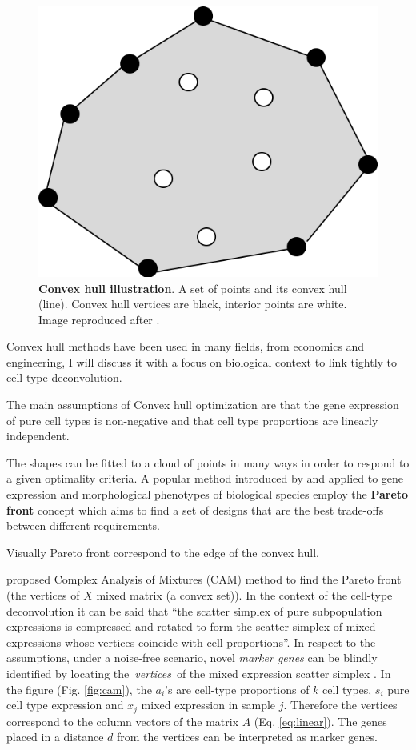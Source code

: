 \documentclass[12pt,]{book}
\theoremstyle{definition}
\theoremstyle{definition}
\theoremstyle{definition}
\theoremstyle{remark}
\begin{document}
\begin{figure}

{\centering \includegraphics[width=0.5\linewidth]{figures-ext/convexhull} 

}

\caption[Convex hull illustration]{\textbf{Convex hull illustration}. A set of
points and its convex hull (line). Convex hull vertices are black,
interior points are white. Image reproduced after \citet{Erickson2018}.}\label{fig:convexhull}
\end{figure}





Convex hull methods have been used in many fields, from economics and
engineering, I will discuss it with a focus on biological context to
link tightly to cell-type deconvolution.

The main assumptions of Convex hull optimization are that the gene
expression of pure cell types is non-negative and that cell type
proportions are linearly independent.

The shapes can be fitted to a cloud of points in many ways in order to
respond to a given optimality criteria. A popular method introduced by
\citet{Shoval2012} and applied to gene expression and morphological
phenotypes of biological species employ the \textbf{Pareto front}
concept which aims to find a set of designs that are the best trade-offs
between different requirements.

Visually Pareto front correspond to the edge of the convex hull.

\citet{Wang2013} proposed Complex Analysis of Mixtures (CAM) method to
find the Pareto front (the vertices of \(X\) mixed matrix (a convex
set)). In the context of the cell-type deconvolution it can be said that
``the scatter simplex of pure subpopulation expressions is compressed
and rotated to form the scatter simplex of mixed expressions whose
vertices coincide with cell proportions''\citep{Wang2016}. In respect to
the assumptions, under a noise-free scenario, novel \emph{marker genes}
can be blindly identified by locating the~\emph{vertices}~of the mixed
expression scatter simplex \citep{Wang2010}. In the figure (Fig.
\ref{fig:cam}), the \(a_i\)'s are cell-type proportions of \(k\) cell
types, \(s_i\) pure cell type expression and \(x_j\) mixed expression in
sample \(j\). Therefore the vertices correspond to the column vectors of
the matrix \(A\) (Eq. \eqref{eq:linear}). The genes placed in a distance
\(d\) from the vertices can be interpreted as marker genes.
\end{document}
